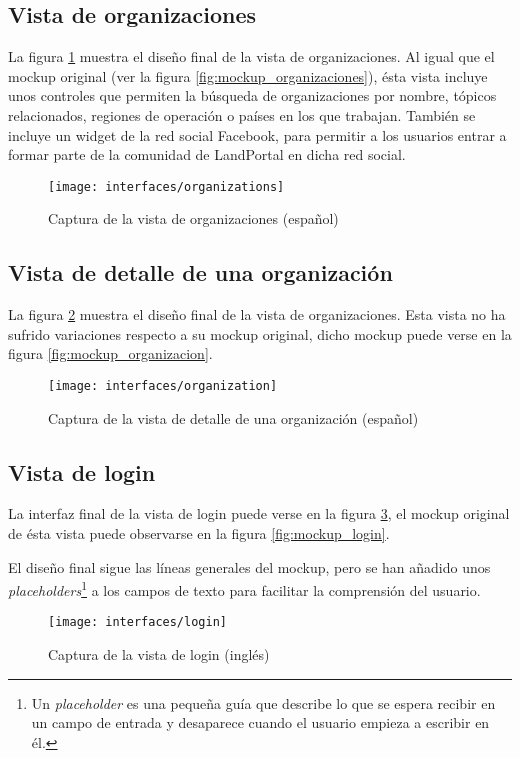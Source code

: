 \subsection{Vista de organizaciones}
La figura \ref{fig:interface_organizaciones} muestra el diseño final de la vista de organizaciones.  Al igual que el mockup original (ver la figura \ref{fig:mockup_organizaciones}), ésta vista incluye unos controles que permiten la búsqueda de organizaciones por nombre, tópicos relacionados, regiones de operación o países en los que trabajan.  También se incluye un widget de la red social Facebook, para permitir a los usuarios entrar a formar parte de la comunidad de LandPortal en dicha red social.
\begin{figure}[h]
	\centering
	\texttt{[image: interfaces/organizations]}
	\caption{Captura de la vista de organizaciones (español)}
	\label{fig:interface_organizaciones}
\end{figure}


\subsection{Vista de detalle de una organización}
La figura \ref{fig:interface_organizacion} muestra el diseño final de la vista de organizaciones.  Esta vista no ha sufrido variaciones respecto a su mockup original, dicho mockup puede verse en la figura \ref{fig:mockup_organizacion}.
\begin{figure}[h]
	\centering
	\texttt{[image: interfaces/organization]}
	\caption{Captura de la vista de detalle de una organización (español)}
	\label{fig:interface_organizacion}
\end{figure}


\subsection{Vista de login}
La interfaz final de la vista de login puede verse en la figura \ref{fig:interface_login},  el mockup original de ésta vista puede observarse en la figura \ref{fig:mockup_login}.  

El diseño final sigue las líneas generales del mockup, pero se han añadido unos \textit{placeholders}\footnote{Un \textit{placeholder} es una pequeña guía que describe lo que se espera recibir en un campo de entrada y desaparece cuando el usuario empieza a escribir en él.} a los campos de texto para facilitar la comprensión del usuario.
\begin{figure}[h]
	\centering
	\texttt{[image: interfaces/login]}
	\caption{Captura de la vista de login (inglés)}
	\label{fig:interface_login}
\end{figure}


